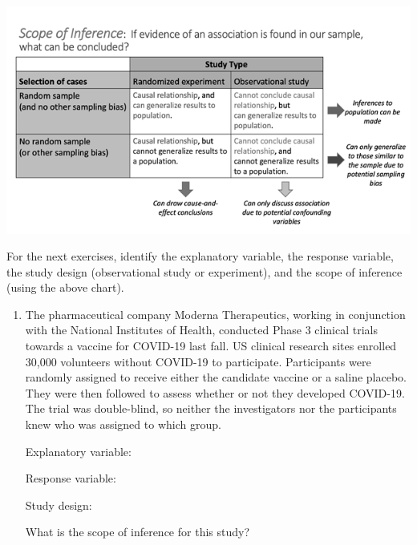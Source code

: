 \documentclass[
]{report}
\begin{document}
\begin{center}\includegraphics[width=0.75\linewidth]{images/ScopeOfInferenceGreyscale} \end{center}

For the next exercises, identify the explanatory variable, the response variable, the study design (observational study or experiment), and the scope of inference (using the above chart).

\begin{enumerate}
\def\labelenumi{\arabic{enumi}.}
\setcounter{enumi}{4}
\item
  The pharmaceutical company Moderna Therapeutics, working in conjunction with the National Institutes of Health, conducted Phase 3 clinical trials towards a vaccine for COVID-19 last fall. US clinical research sites enrolled 30,000 volunteers without COVID-19 to participate. Participants were randomly assigned to receive either the candidate vaccine or a saline placebo. They were then followed to assess whether or not they developed COVID-19. The trial was double-blind, so neither the investigators nor the participants knew who was assigned to which group.
  \vspace{0.1in}

  Explanatory variable:
  \vspace{0.25in}

  Response variable:
  \vspace{0.25in}

  Study design:
  \vspace{0.25in}

  What is the scope of inference for this study?
  \vspace{0.5in}
\end{enumerate}

\newpage
\end{document}

